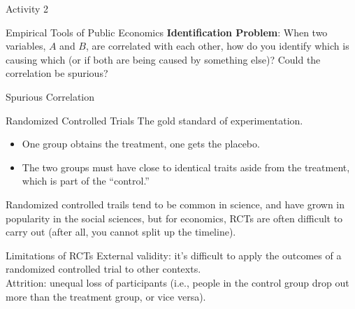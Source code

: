 \documentclass[10pt]{extarticle}
\begin{document}
  \begin{problem}{Activity 2}
   \begin{tcbraster}[raster columns = 1,colframe = black!75!white,colback=white]
   \end{tcbraster} 
  \end{problem}
  \begin{problem}{Empirical Tools of Public Economics}
    \textbf{Identification Problem}: When two variables, $A$ and $B$, are correlated with each other, how do you identify which is causing which (or if both are being caused by something else)? Could the correlation be spurious?
    \begin{problem}{Spurious Correlation}
      \begin{tcbraster}[raster columns = 1,colframe = black!75!white,colback=white]
      \end{tcbraster}
    \end{problem}
    \begin{problem}{Randomized Controlled Trials}
      The gold standard of experimentation.
      \begin{itemize}
        \item One group obtains the treatment, one gets the placebo.
        \item The two groups must have close to identical traits aside from the treatment, which is part of the ``control.''
      \end{itemize}
      Randomized controlled trails tend to be common in science, and have grown in popularity in the social sciences, but for economics, RCTs are often difficult to carry out (after all, you cannot split up the timeline).
      \begin{problem}{Limitations of RCTs}
        External validity: it's difficult to apply the outcomes of a randomized controlled trial to other contexts.\\

        Attrition: unequal loss of participants (i.e., people in the control group drop out more than the treatment group, or vice versa).\\


\end{problem}
\end{problem}
\end{problem}
\end{document}
